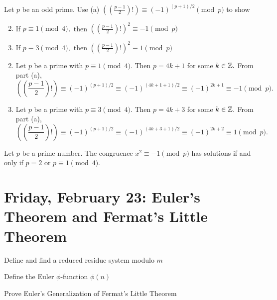 \documentclass[letterpaper, 11 pt]{ximera}
\begin{document}
\begin{br}
    Let $p$ be an odd prime. Use (a) $\left(\left(\frac{p-1}{2}\right)!\right)\equiv (-1)^{(p+1)/2} \pmod{p}$ to show
    \begin{enumerate}[label=(\alph*)]
        \setcounter{enumi}{1}
        \item If $p\equiv 1\pmod{4},$ then $\left(\left(\frac{p-1}{2}\right)!\right)^2\equiv -1 \pmod{p}$
        
        \item If $p\equiv 3\pmod{4},$ then $\left(\left(\frac{p-1}{2}\right)!\right)^2\equiv 1 \pmod{p}$
    \end{enumerate}

    \begin{solution}

        \begin{enumerate}[label=(\alph*)]
            \setcounter{enumi}{1}
            \item Let $p$ be a prime with $p\equiv 1 \pmod 4.$ Then $p=4k+1$ for some $k\in\mathbb Z.$ From part (a), 
            \[\left(\left(\frac{p-1}{2}\right)!\right)\equiv (-1)^{(p+1)/2} \equiv (-1)^{(4k+1+1)/2}\equiv (-1)^{2k+1}\equiv -1 \pmod{p}.\]

            \item Let $p$ be a prime with $p\equiv 3 \pmod 4.$ Then $p=4k+3$ for some $k\in\mathbb Z.$ From part (a), 
            \[\left(\left(\frac{p-1}{2}\right)!\right)\equiv (-1)^{(p+1)/2} \equiv (-1)^{(4k+3+1)/2}\equiv (-1)^{2k+2}\equiv 1 \pmod{p}.\]
            
        \end{enumerate}
        
    \end{solution}
\end{br}


\begin{thm*}
    Let $p$ be a prime number. The congruence $x^2\equiv -1 \pmod p$ has solutions if and only if $p=2$ or $p\equiv 1 \pmod 4.$
\end{thm*}

\section{Friday, February 23: Euler's Theorem and Fermat's Little Theorem}
\begin{obj}
	\item Define and find a reduced residue system modulo $m$
	\item Define the Euler $\phi$-function $\phi(n)$
	\item Prove Euler's Generalization of Fermat's Little Theorem
\end{obj}
\end{document}
